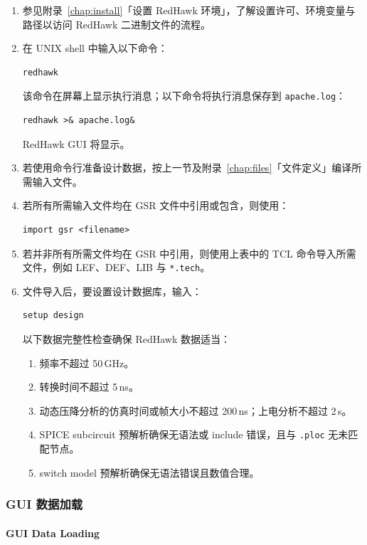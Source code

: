 \begin{enumerate}
  \item 参见附录~\ref{chap:install}「设置 RedHawk 环境」，了解设置许可、环境变量与路径以访问 RedHawk 二进制文件的流程。
  \item 在 UNIX shell 中输入以下命令：
\begin{lstlisting}
redhawk
\end{lstlisting}
  该命令在屏幕上显示执行消息；以下命令将执行消息保存到 \texttt{apache.log}：
\begin{lstlisting}
redhawk >& apache.log&
\end{lstlisting}
  RedHawk GUI 将显示。

  \item 若使用命令行准备设计数据，按上一节及附录~\ref{chap:files}「文件定义」编译所需输入文件。

  \item 若所有所需输入文件均在 GSR 文件中引用或包含，则使用：
\begin{lstlisting}
import gsr <filename>
\end{lstlisting}

  \item 若并非所有所需文件均在 GSR 中引用，则使用上表中的 TCL 命令导入所需文件，例如 LEF、DEF、LIB 与 \texttt{*.tech}。

  \item 文件导入后，要设置设计数据库，输入：
\begin{lstlisting}
setup design
\end{lstlisting}
  以下数据完整性检查确保 RedHawk 数据适当：
  \begin{enumerate}
    \item 频率不超过 50\,GHz。
    \item 转换时间不超过 5\,ns。
    \item 动态压降分析的仿真时间或帧大小不超过 200\,ns；上电分析不超过 2\,\textmu s。
    \item SPICE subcircuit 预解析确保无语法或 include 错误，且与 \texttt{.ploc} 无未匹配节点。
    \item switch model 预解析确保无语法错误且数值合理。
  \end{enumerate}
\end{enumerate}

\subsubsection{GUI 数据加载}
\paragraph*{GUI Data Loading}

